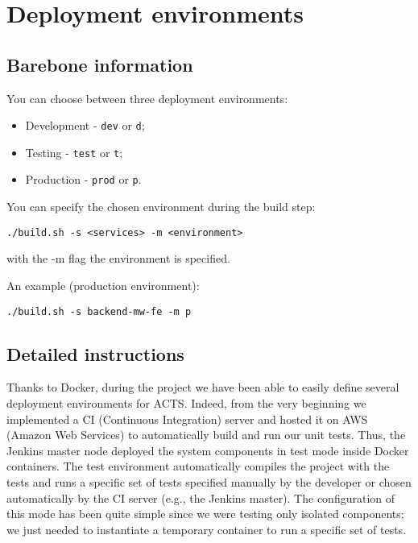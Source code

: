
\section{Deployment environments}

\subsection{Barebone information}

You can choose between three deployment environments:

\begin{itemize}
\item Development - \texttt{dev} or \texttt{d};
\item Testing - \texttt{test} or \texttt{t};
\item Production - \texttt{prod} or \texttt{p}.
\end{itemize}

You can specify the chosen environment during the build step:

\begin{lstlisting}
./build.sh -s <services> -m <environment>
\end{lstlisting}

with the -m flag the environment is specified.


An example (production environment):

\begin{lstlisting}
./build.sh -s backend-mw-fe -m p
\end{lstlisting}

\subsection{Detailed instructions}
Thanks to Docker, during the project we have been able to easily define several
deployment environments for ACTS. Indeed, from the very beginning we implemented a CI (Continuous Integration) server and hosted it
on AWS (Amazon Web Services) to automatically build and run our unit tests.
Thus, the Jenkins master node deployed the
system components in test mode inside Docker containers.
The test environment automatically compiles the project with the tests and
runs a specific set of tests specified manually by the developer or chosen automatically by
the CI server (e.g., the Jenkins master). The configuration of this mode has been quite simple
since we were testing only isolated components;
we just needed to instantiate a temporary
container to run a specific set of tests.


